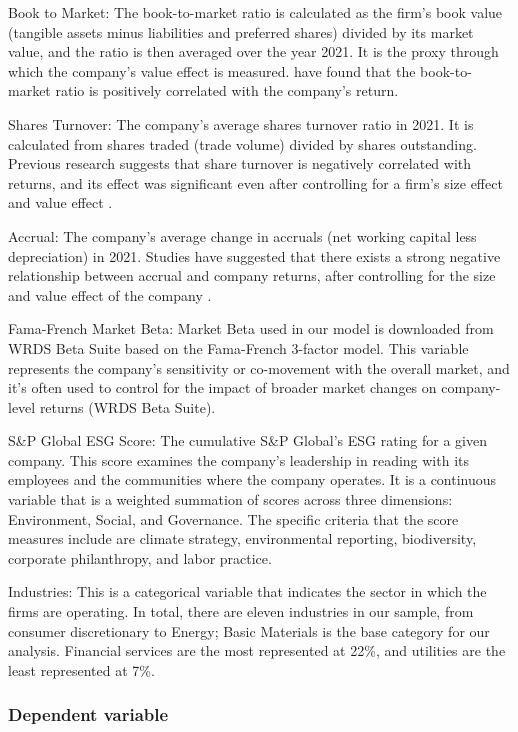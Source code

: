 \documentclass[man,natbib,floatsintext]{apa6}
\begin{document}
Book to Market: The book-to-market ratio is calculated as the firm's book value (tangible assets minus liabilities and preferred shares) divided by its market value, and the ratio is then averaged over the year 2021. It is the proxy through which the company's value effect is measured. \citet{stattman2020, fama_french_1993} have found that the book-to-market ratio is positively correlated with the company's return. 

Shares Turnover: The company's average shares turnover ratio in 2021. It is calculated from shares traded (trade volume) divided by shares outstanding. Previous research suggests that share turnover is negatively correlated with returns, and its effect was significant even after controlling for a firm's size effect and value effect \citep{lee_swaminathan_2000}. 

Accrual: The company's average change in accruals (net working capital less depreciation) in 2021. Studies have suggested that there exists a strong negative relationship between accrual and company returns, after controlling for the size and value effect of the company \citep{richardson_sloan_soliman_tuna_2005}.

Fama-French Market Beta: Market Beta used in our model is downloaded from WRDS Beta Suite based on the Fama-French 3-factor model. This variable represents the company's sensitivity or co-movement with the overall market, and it's often used to control for the impact of broader market changes on company-level returns (WRDS Beta Suite). 

S\&P Global ESG Score: The cumulative S\&P Global's ESG rating for a given company. This score examines the company's leadership in reading with its employees and the communities where the company operates. It is a continuous variable that is a weighted summation of scores across three dimensions: Environment, Social, and Governance. The specific criteria that the score measures include are climate strategy, environmental reporting, biodiversity, corporate philanthropy, and labor practice. 

Industries: This is a categorical variable that indicates the sector in which the firms are operating. In total, there are eleven industries in our sample, from consumer discretionary to Energy; Basic Materials is the base category for our analysis. Financial services are the most represented at 22\%, and utilities are the least represented at 7\%. 

\subsubsection{{Dependent variable}}
\end{document}
